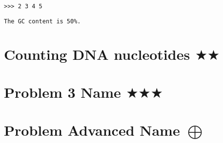 \documentclass[12pt, letterpaper]{article}
\begin{document}
\texttt{>{>}> 2 3 4 5}

\texttt{The GC content is 50\%.}

\section{\upshape Counting DNA nucleotides $\bigstar\bigstar$}







\section{\upshape Problem 3 Name $\bigstar\bigstar\bigstar$}

\section{\upshape Problem Advanced Name $\bigoplus$}
\end{document}
